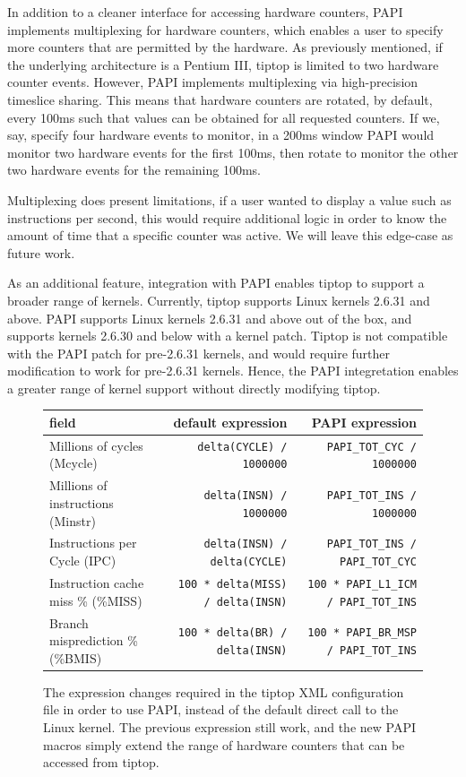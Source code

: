 In addition to a cleaner interface for accessing hardware counters, PAPI implements multiplexing for hardware counters, which enables a user to specify more counters that are permitted by the hardware.
As previously mentioned, if the underlying architecture is a Pentium III, tiptop is limited to two hardware counter events. However, PAPI implements multiplexing via high-precision timeslice sharing. This means that hardware counters are rotated, by default, every 100ms such that values can be obtained for all requested counters.
If we, say, specify four hardware events to monitor, in a 200ms window PAPI would monitor two hardware events for the first 100ms, then rotate to monitor the other two hardware events for the remaining 100ms.

Multiplexing does present limitations, if a user wanted to display a value such as instructions per second, this would require additional logic in order to know the amount of time that a specific counter was active.
We will leave this edge-case as future work.

As an additional feature, integration with PAPI enables tiptop to support a broader range of kernels. Currently, tiptop supports Linux kernels 2.6.31 and above.
PAPI supports Linux kernels 2.6.31 and above out of the box, and supports kernels 2.6.30 and below with a kernel patch.
Tiptop is not compatible with the PAPI patch for pre-2.6.31 kernels, and would require further modification to work for pre-2.6.31 kernels.
Hence, the PAPI integretation enables a greater range of kernel support without directly modifying tiptop.

\begin{figure}[t]
\footnotesize
\centering
\begin{tabular}{lrr}
\toprule
field & default expression & PAPI expression \\
\midrule
Millions of cycles (Mcycle) & \texttt{delta(CYCLE) / 1000000} & \texttt{PAPI\_TOT\_CYC / 1000000} \\
Millions of instructions (Minstr) & \texttt{delta(INSN) / 1000000} & \texttt{PAPI\_TOT\_INS / 1000000} \\
Instructions per Cycle (IPC) & \texttt{delta(INSN) / delta(CYCLE)} & \texttt{PAPI\_TOT\_INS / PAPI\_TOT\_CYC} \\
Instruction cache miss \% (\%MISS) & \texttt{100 * delta(MISS) / delta(INSN)} & \texttt{100 * PAPI\_L1\_ICM / PAPI\_TOT\_INS} \\
Branch misprediction \% (\%BMIS) & \texttt{100 * delta(BR) / delta(INSN)} & \texttt{100 * PAPI\_BR\_MSP / PAPI\_TOT\_INS} \\
\bottomrule
\end{tabular}
\caption{The expression changes required in the tiptop XML configuration file in order to use PAPI, instead of the default direct call to the Linux kernel. The previous expression still work, and the new PAPI macros simply extend the range of hardware counters that can be accessed from tiptop.}
\label{fig:tiptop-papi-expressions}
\end{figure}

